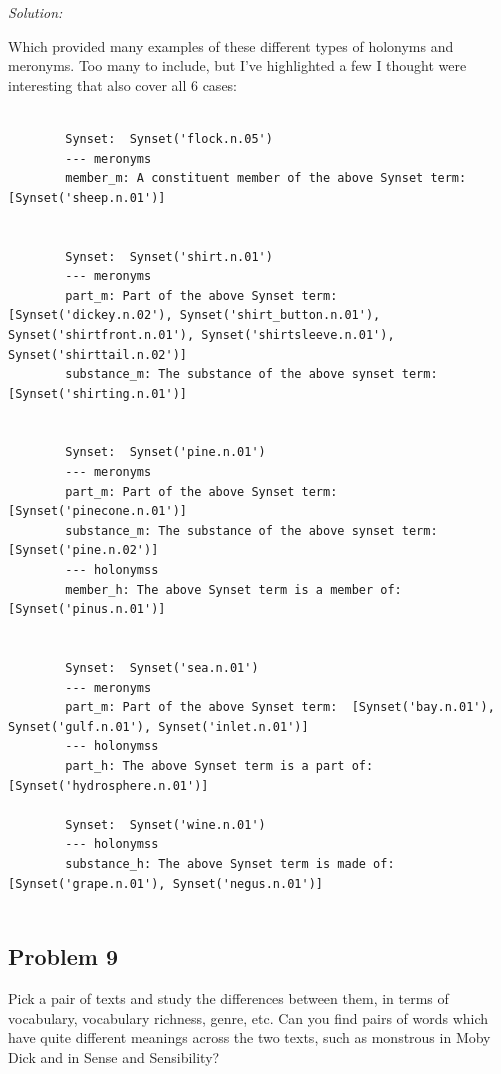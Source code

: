 \documentclass[11pt]{article}
\newenvironment{solution}{
	\vspace{10px}\noindent\emph{Solution:}
}{
	\vspace{10px}
}
\begin{document}
\begin{solution}
	Which provided many examples of these different types of holonyms and meronyms. Too many to include, but I've highlighted a few I thought were interesting that also cover all 6 cases:
	\begin{lstlisting}
		
		Synset:  Synset('flock.n.05')
		--- meronyms
		member_m: A constituent member of the above Synset term:  [Synset('sheep.n.01')]
		
		
		Synset:  Synset('shirt.n.01')
		--- meronyms
		part_m: Part of the above Synset term:  [Synset('dickey.n.02'), Synset('shirt_button.n.01'), Synset('shirtfront.n.01'), Synset('shirtsleeve.n.01'), Synset('shirttail.n.02')]
		substance_m: The substance of the above synset term:  [Synset('shirting.n.01')]
		
		
		Synset:  Synset('pine.n.01')
		--- meronyms
		part_m: Part of the above Synset term:  [Synset('pinecone.n.01')]
		substance_m: The substance of the above synset term:  [Synset('pine.n.02')]
		--- holonymss
		member_h: The above Synset term is a member of:  [Synset('pinus.n.01')]
		
		
		Synset:  Synset('sea.n.01')
		--- meronyms
		part_m: Part of the above Synset term:  [Synset('bay.n.01'), Synset('gulf.n.01'), Synset('inlet.n.01')]
		--- holonymss
		part_h: The above Synset term is a part of:  [Synset('hydrosphere.n.01')]
		
		Synset:  Synset('wine.n.01')
		--- holonymss
		substance_h: The above Synset term is made of:  [Synset('grape.n.01'), Synset('negus.n.01')]
		
	\end{lstlisting}
\end{solution}  


\subsection*{Problem 9}
Pick a pair of texts and study the differences between them, in terms of vocabulary, vocabulary richness, genre, etc. Can you find pairs of words which have quite different meanings across the two texts, such as monstrous in Moby Dick and in Sense and Sensibility?
\end{document}
